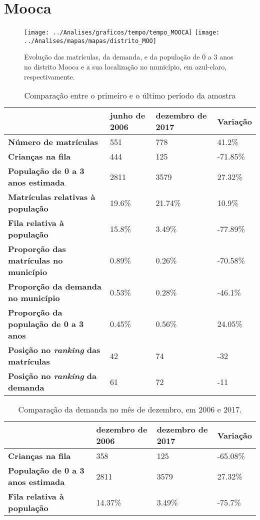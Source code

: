 \section{Mooca}
\begin{figure}[H]
\centering
\texttt{[image: ../Analises/graficos/tempo/tempo\_MOOCA]}
\texttt{[image: ../Analises/mapas/mapas/distrito\_MOO]}
\caption{Evolução das matrículas, da demanda, e da população de 0 a 3 anos no distrito Mooca e a sua localização no município, em azul-claro, respectivamente.}
\end{figure}
\begin{table}[H]
\begin{tabular}{l|l|l|l}
\textbf{}                                      & \textbf{junho de 2006}       & \textbf{dezembro de 2017}    & \textbf{Variação} \\ \hline
\textbf{Número de matrículas}                  & 551 & 778 & 41.2\% \\ \hline
\textbf{Crianças na fila}                      & 444 & 125 & -71.85\% \\ \hline
\textbf{População de 0 a 3 anos estimada}      & 2811 & 3579 & 27.32\% \\ \hline
\textbf{Matrículas relativas à população}      & 19.6\% & 21.74\% & 10.9\% \\ \hline
\textbf{Fila relativa à população}             & 15.8\% & 3.49\% & -77.89\% \\ \hline
\textbf{Proporção das matrículas no município} & 0.89\% & 0.26\% & -70.58\% \\ \hline
\textbf{Proporção da demanda no município}     & 0.53\% & 0.28\% & -46.1\% \\ \hline
\textbf{Proporção da população de 0 a 3 anos}  & 0.45\% & 0.56\% & 24.05\% \\ \hline
\textbf{Posição no \textit{ranking} das matrículas}     & 42 & 74 & -32 \\ \hline
\textbf{Posição no \textit{ranking} da demanda}         & 61 & 72 & -11 \\ 
\end{tabular}
\caption{Comparação entre o primeiro e o último período da amostra}
\end{table}
\begin{table}[H]
\begin{tabular}{l|l|l|l}
\textbf{}                                 & \textbf{dezembro de 2006} & \textbf{dezembro de 2017} & \textbf{Variação} \\ \hline
\textbf{Crianças na fila}                      & 358 & 125 & -65.08\% \\ \hline
\textbf{População de 0 a 3 anos estimada}      & 2811 & 3579 & 27.32\% \\ \hline
\textbf{Fila relativa à população}             & 14.37\% & 3.49\% & -75.7\% \\
\end{tabular}
\caption{Comparação da demanda no mês de dezembro, em 2006 e 2017.}
\end{table}
